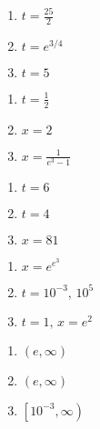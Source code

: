 \documentclass{ximera}
\begin{document}
\begin{enumerate}
\setcounter{enumi}{\value{HW}}

\item $t=\frac{25}{2}$
\item $t=e^{3/4}$
\item $t = 5$

\setcounter{HW}{\value{enumi}}
\end{enumerate}

\begin{enumerate}
\setcounter{enumi}{\value{HW}}

\item $t = \frac{1}{2}$
\item $x = 2$
\item $x = \frac{1}{e^3-1}$

\setcounter{HW}{\value{enumi}}
\end{enumerate}

\begin{enumerate}
\setcounter{enumi}{\value{HW}}

\item $t=6$
\item $t=4$
\item $x = 81$

\setcounter{HW}{\value{enumi}}
\end{enumerate}

\begin{enumerate}
\setcounter{enumi}{\value{HW}}

\item $x = e^{e^3}$
\item $t=10^{-3}, \, 10^{5}$
\item $t = 1, \, x = e^{2}$

\setcounter{HW}{\value{enumi}}
\end{enumerate}

\begin{enumerate}
\setcounter{enumi}{\value{HW}}

\item $(e, \infty)$
\item $(e, \infty)$
\item $\left[10^{-3}, \infty \right)$

\setcounter{HW}{\value{enumi}}
\end{enumerate}
\end{document}
